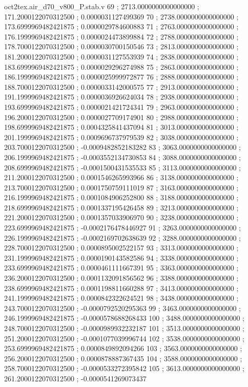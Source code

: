 \begin{filecontents}[overwrite]{oct2tex.air_d70_v800_P.stab.v}
69 ; 2713.0000000000000000 ; 171.2000122070312500 ; 0.0000031127499369
70 ; 2738.0000000000000000 ; 173.6999969482421875 ; 0.0000029784600883
71 ; 2763.0000000000000000 ; 176.1999969482421875 ; 0.0000024473899884
72 ; 2788.0000000000000000 ; 178.7000122070312500 ; 0.0000030700150546
73 ; 2813.0000000000000000 ; 181.2000122070312500 ; 0.0000031127553939
74 ; 2838.0000000000000000 ; 183.6999969482421875 ; 0.0000029296274988
75 ; 2863.0000000000000000 ; 186.1999969482421875 ; 0.0000025999972877
76 ; 2888.0000000000000000 ; 188.7000122070312500 ; 0.0000033142000575
77 ; 2913.0000000000000000 ; 191.1999969482421875 ; 0.0000036926624034
78 ; 2938.0000000000000000 ; 193.6999969482421875 ; 0.0000021421724341
79 ; 2963.0000000000000000 ; 196.2000122070312500 ; 0.0000027709174901
80 ; 2988.0000000000000000 ; 198.6999969482421875 ; 0.0004325841437094
81 ; 3013.0000000000000000 ; 201.1999969482421875 ; 0.0009696737979539
82 ; 3038.0000000000000000 ; 203.7000122070312500 ; -0.0009482852183282
83 ; 3063.0000000000000000 ; 206.1999969482421875 ; -0.0003552134730853
84 ; 3088.0000000000000000 ; 208.6999969482421875 ; -0.0001500431535533
85 ; 3113.0000000000000000 ; 211.2000122070312500 ; 0.0001546265993966
86 ; 3138.0000000000000000 ; 213.7000122070312500 ; 0.0001750759111019
87 ; 3163.0000000000000000 ; 216.1999969482421875 ; 0.0001084906252800
88 ; 3188.0000000000000000 ; 218.6999969482421875 ; 0.0001337195426458
89 ; 3213.0000000000000000 ; 221.2000122070312500 ; 0.0001357033906970
90 ; 3238.0000000000000000 ; 223.6999969482421875 ; -0.0002176478446927
91 ; 3263.0000000000000000 ; 226.1999969482421875 ; -0.0002169702638639
92 ; 3288.0000000000000000 ; 228.7000122070312500 ; 0.0000895002522157
93 ; 3313.0000000000000000 ; 231.1999969482421875 ; 0.0000190143582586
94 ; 3338.0000000000000000 ; 233.6999969482421875 ; 0.0000461111667391
95 ; 3363.0000000000000000 ; 236.2000122070312500 ; 0.0001132091856562
96 ; 3388.0000000000000000 ; 238.6999969482421875 ; 0.0001198811660288
97 ; 3413.0000000000000000 ; 241.1999969482421875 ; 0.0000842322624521
98 ; 3438.0000000000000000 ; 243.7000122070312500 ; -0.0000792520295363
99 ; 3463.0000000000000000 ; 246.1999969482421875 ; -0.0000578688268433
100 ; 3488.0000000000000000 ; 248.7000122070312500 ; -0.0000989932232187
101 ; 3513.0000000000000000 ; 251.2000122070312500 ; -0.0001077039996744
102 ; 3538.0000000000000000 ; 253.6999969482421875 ; 0.0000849892094266
103 ; 3563.0000000000000000 ; 256.2000122070312500 ; 0.0000878887367435
104 ; 3588.0000000000000000 ; 258.7000122070312500 ; -0.0000533272395842
105 ; 3613.0000000000000000 ; 261.2000122070312500 ; -0.0000541269073437

\end{filecontents}
